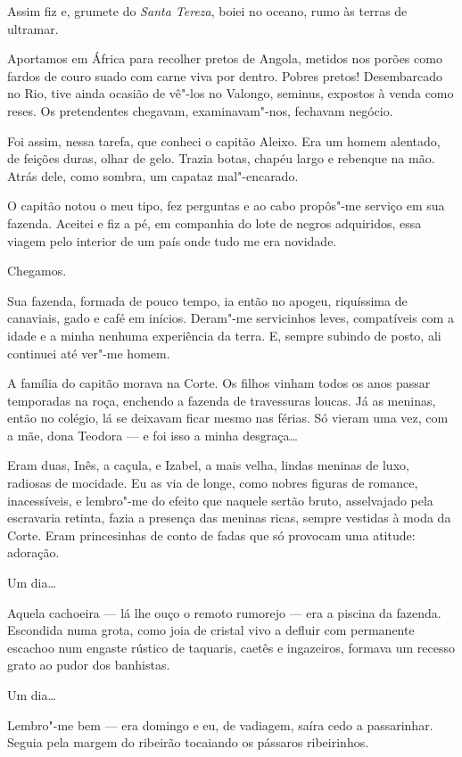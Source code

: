 Assim fiz e, grumete do \emph{Santa Tereza}, boiei no oceano, rumo às
terras de ultramar.

Aportamos em África para recolher pretos de Angola, metidos nos porões
como fardos de couro suado com carne viva por dentro. Pobres pretos!
Desembarcado no Rio, tive ainda ocasião de vê"-los no Valongo, seminus,
expostos à venda como reses. Os pretendentes chegavam, examinavam"-nos,
fechavam negócio.

Foi assim, nessa tarefa, que conheci o capitão Aleixo. Era um homem
alentado, de feições duras, olhar de gelo. Trazia botas, chapéu largo e
rebenque na mão. Atrás dele, como sombra, um capataz mal"-encarado.

O capitão notou o meu tipo, fez perguntas e ao cabo propôs"-me serviço em
sua fazenda. Aceitei e fiz a pé, em companhia do lote de negros
adquiridos, essa viagem pelo interior de um país onde tudo me era
novidade.

Chegamos.

Sua fazenda, formada de pouco tempo, ia então no apogeu, riquíssima de
canaviais, gado e café em inícios. Deram"-me servicinhos leves,
compatíveis com a idade e a minha nenhuma experiência da terra. E,
sempre subindo de posto, ali continuei até ver"-me homem.

A família do capitão morava na Corte. Os filhos vinham todos os anos
passar temporadas na roça, enchendo a fazenda de travessuras loucas. Já
as meninas, então no colégio, lá se deixavam ficar mesmo nas férias. Só
vieram uma vez, com a mãe, dona Teodora --- e foi isso a minha
desgraça\ldots{}

Eram duas, Inês, a caçula, e Izabel, a mais velha, lindas meninas de
luxo, radiosas de mocidade. Eu as via de longe, como nobres figuras de
romance, inacessíveis, e lembro"-me do efeito que naquele sertão bruto,
asselvajado pela escravaria retinta, fazia a presença das meninas ricas,
sempre vestidas à moda da Corte. Eram princesinhas de conto de fadas que
só provocam uma atitude: adoração.

Um dia\ldots{}

Aquela cachoeira --- lá lhe ouço o remoto rumorejo --- era a piscina da
fazenda. Escondida numa grota, como joia de cristal vivo a defluir com
permanente escachoo num engaste rústico de taquaris, caetês e
ingazeiros, formava um recesso grato ao pudor dos banhistas.

Um dia\ldots{}

Lembro"-me bem --- era domingo e eu, de vadiagem, saíra cedo a
passarinhar. Seguia pela margem do ribeirão tocaiando os pássaros
ribeirinhos.

